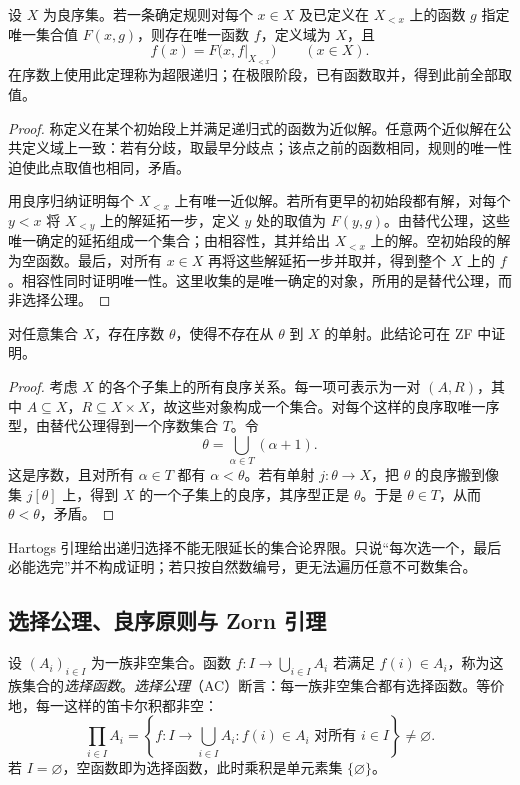 \begin{lemma}[沿良序的递归]\label{lem:y0-transfinite-recursion}
设 $X$ 为良序集。若一条确定规则对每个 $x\in X$ 及已定义在 $X_{<x}$ 上的函数 $g$ 指定唯一集合值 $F(x,g)$，则存在唯一函数 $f$，定义域为 $X$，且
\[
 f(x)=F\bigl(x,f|_{X_{<x}}\bigr)\qquad(x\in X).
\]
在序数上使用此定理称为超限递归；在极限阶段，已有函数取并，得到此前全部取值。
\end{lemma}
\begin{proof}
称定义在某个初始段上并满足递归式的函数为近似解。任意两个近似解在公共定义域上一致：若有分歧，取最早分歧点；该点之前的函数相同，规则的唯一性迫使此点取值也相同，矛盾。

用良序归纳证明每个 $X_{<x}$ 上有唯一近似解。若所有更早的初始段都有解，对每个 $y<x$ 将 $X_{<y}$ 上的解延拓一步，定义 $y$ 处的取值为 $F(y,g)$。由替代公理，这些唯一确定的延拓组成一个集合；由相容性，其并给出 $X_{<x}$ 上的解。空初始段的解为空函数。最后，对所有 $x\in X$ 再将这些解延拓一步并取并，得到整个 $X$ 上的 $f$。相容性同时证明唯一性。这里收集的是唯一确定的对象，所用的是替代公理，而非选择公理。
\end{proof}

\begin{lemma}[Hartogs 引理]\label{lem:y0-hartogs}
对任意集合 $X$，存在序数 $\theta$，使得不存在从 $\theta$ 到 $X$ 的单射。此结论可在 ZF 中证明。
\end{lemma}
\begin{proof}
考虑 $X$ 的各个子集上的所有良序关系。每一项可表示为一对 $(A,R)$，其中 $A\subseteq X$，$R\subseteq X\times X$，故这些对象构成一个集合。对每个这样的良序取唯一序型，由替代公理得到一个序数集合 $T$。令
\[
 \theta=\bigcup_{\alpha\in T}(\alpha+1).
\]
这是序数，且对所有 $\alpha\in T$ 都有 $\alpha<\theta$。若有单射 $j:\theta\to X$，把 $\theta$ 的良序搬到像集 $j[\theta]$ 上，得到 $X$ 的一个子集上的良序，其序型正是 $\theta$。于是 $\theta\in T$，从而 $\theta<\theta$，矛盾。
\end{proof}

Hartogs 引理给出递归选择不能无限延长的集合论界限。只说“每次选一个，最后必能选完”并不构成证明；若只按自然数编号，更无法遍历任意不可数集合。

\subsection{选择公理、良序原则与 Zorn 引理}
\begin{definition}[选择函数与选择公理]\label{def:y0-choice}
设 $(A_i)_{i\in I}$ 为一族非空集合。函数 $f:I\to\bigcup_{i\in I}A_i$ 若满足 $f(i)\in A_i$，称为这族集合的\emph{选择函数}。\emph{选择公理}（AC）断言：每一族非空集合都有选择函数。等价地，每一这样的笛卡尔积都非空：
\[
 \prod_{i\in I}A_i
 =\left\{f:I\to\bigcup_{i\in I}A_i:
          f(i)\in A_i\text{ 对所有 }i\in I\right\}\ne\varnothing.
\]
若 $I=\varnothing$，空函数即为选择函数，此时乘积是单元素集 $\{\varnothing\}$。
\end{definition}

